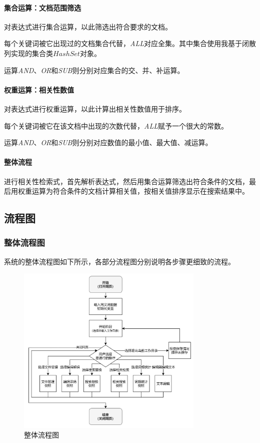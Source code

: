 \documentclass[scheme = chinese]{ctexart}
\begin{document}
\paragraph{集合运算：文档范围筛选} 对表达式进行集合运算，以此筛选出符合要求的文档。

每个关键词被它出现过的文档集合代替，\emph{ALL}对应全集。其中集合使用我基于闭散列实现的集合类$HashSet$对象。

运算\emph{AND}、\emph{OR}和\emph{SUB}则分别对应集合的交、并、补运算。

\paragraph{权重运算：相关性数值} 对表达式进行权重运算，以此计算出相关性数值用于排序。

每个关键词被它在该文档中出现的次数代替，\emph{ALL}赋予一个很大的常数。

运算\emph{AND}、\emph{OR}和\emph{SUB}则分别对应数值的最小值、最大值、减运算。

\paragraph{整体流程} 进行相关性检索式，首先解析表达式，然后用集合运算筛选出符合条件的文档，最后用权重运算为符合条件的文档计算相关值，按相关值排序显示在搜索结果中。

\subsection{流程图}

\subsubsection{整体流程图}
系统的整体流程图如下所示，各部分流程图分别说明各步骤更细致的流程。

\begin{figure}[h]
    \centering
    \includegraphics[width=0.8\textwidth]{images/dsacd-总流程图.drawio.png}
    \caption{整体流程图}
\end{figure}
\end{document}
